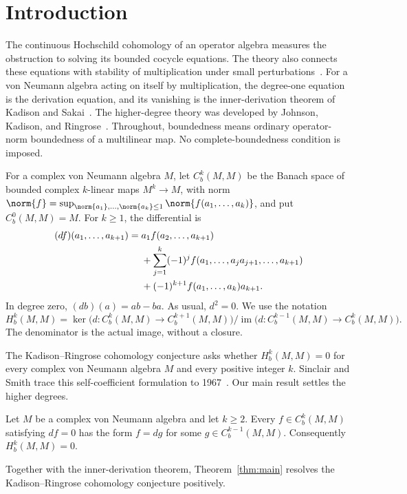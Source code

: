 \begin{abstract}
We prove that every bounded Hochschild cocycle of degree at least two
on a complex von Neumann algebra, with values in the algebra itself,
has a bounded primitive. Together with the established degree-one
inner-derivation theorem, this resolves the Kadison--Ringrose cohomology
conjecture positively.
\end{abstract}
\section{Introduction}\label{sec:introduction}

The continuous Hochschild cohomology of an operator algebra measures
the obstruction to solving its bounded cocycle equations. The theory
also connects these equations with stability of multiplication under
small perturbations~\cite[Chapter~7]{SinclairSmith1995}.
For a von Neumann algebra acting on itself by multiplication, the
degree-one equation is the derivation equation, and its vanishing is
the inner-derivation theorem of Kadison and
Sakai~\cite{Kadison1966,Sakai1966}.
The higher-degree theory was developed by Johnson, Kadison, and
Ringrose~\cite{KadisonRingrose1971,KadisonRingrose1971II,JKR1972}.
Throughout, boundedness means ordinary
operator-norm boundedness of a multilinear map. No complete-boundedness
condition is imposed.

For a complex von Neumann algebra \(M\), let \(C_b^k(M,M)\) be the
Banach space of bounded complex \(k\)-linear maps \(M^k\to M\),
with norm
$\norm{f}=\sup_{\norm{a_1},\ldots,\norm{a_k}\leq1}
\norm{f(a_1,\ldots,a_k)}$, and put \(C_b^0(M,M)=M\).
For \(k\geq1\), the differential is
\begin{align}
(df)(a_1,\ldots,a_{k+1})
={}&a_1f(a_2,\ldots,a_{k+1})\notag\\
&+\sum_{j=1}^k(-1)^j
 f(a_1,\ldots,a_ja_{j+1},\ldots,a_{k+1})\notag\\
&+(-1)^{k+1}f(a_1,\ldots,a_k)a_{k+1}.
\label{eq:differential}
\end{align}
In degree zero, \((db)(a)=ab-ba\). As usual, \(d^2=0\).
We use the notation
\[
H_b^k(M,M)=
\ker\bigl(d:C_b^k(M,M)\to C_b^{k+1}(M,M)\bigr)
\big/
\operatorname{im}\bigl(d:C_b^{k-1}(M,M)\to C_b^k(M,M)\bigr).
\]
The denominator is the actual image, without a closure.

The Kadison--Ringrose cohomology conjecture asks whether
\(H_b^k(M,M)=0\) for every complex von Neumann algebra \(M\) and
every positive integer \(k\). Sinclair and Smith trace this
self-coefficient formulation to 1967~\cite[p.~3376]{SinclairSmith1998}.
Our main result settles the higher degrees.

\begin{theorem}\label{thm:main}
Let \(M\) be a complex von Neumann algebra and let \(k\geq2\).
Every \(f\in C_b^k(M,M)\) satisfying \(df=0\) has the form
\(f=dg\) for some \(g\in C_b^{k-1}(M,M)\).
Consequently \(H_b^k(M,M)=0\).
\end{theorem}

Together with the inner-derivation theorem,
Theorem~\ref{thm:main} resolves the Kadison--Ringrose cohomology
conjecture positively.
